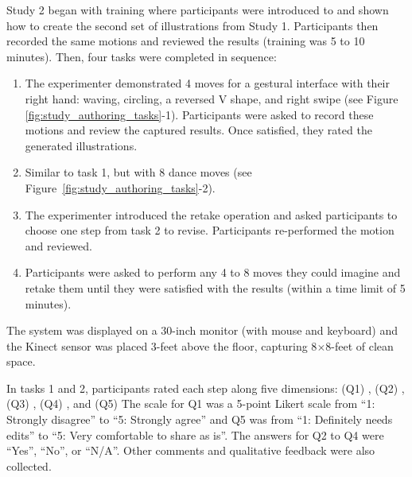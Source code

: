 %
Study 2 began with training where participants were introduced to \systemname{} and shown how to create the second set of illustrations from Study 1.
Participants then recorded the same motions and reviewed the results (training was 5 to 10 minutes).
%
Then, four tasks were completed in sequence:
\begin{enumerate}
  \itemsep -3pt
  \item The experimenter demonstrated 4 moves for a gestural interface with their right hand: waving, circling, a reversed V shape, and right swipe (see Figure \ref{fig:study_authoring_tasks}-1). Participants were asked to record these motions and review the captured results. Once satisfied, they rated the generated illustrations.
  \item Similar to task 1, but with 8 dance moves (see Figure~\ref{fig:study_authoring_tasks}-2).
  \item The experimenter introduced the retake operation and asked participants to choose one step from task 2 to revise. Participants re-performed the motion and reviewed.
  \item Participants were asked to perform any 4 to 8 moves they could imagine and retake them until they were satisfied with the results (within a time limit of 5 minutes).
\end{enumerate}
%
The system was displayed on a 30-inch monitor (with mouse and keyboard) and the Kinect sensor was placed 3-feet above the floor, capturing 8$\times$8-feet of clean space.

%
In tasks 1 and 2, participants rated each step along five dimensions: (Q1) , (Q2) , (Q3) , (Q4) , and (Q5) 
%
The scale for Q1 was a 5-point Likert scale from ``1: Strongly disagree'' to ``5: Strongly agree'' and Q5 was from ``1: Definitely needs edits'' to ``5: Very comfortable to share as is''. The answers for Q2 to Q4 were ``Yes'', ``No'', or ``N/A''.
%
%
Other comments and qualitative feedback were also collected.


